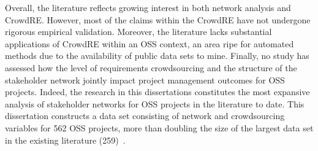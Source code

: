 Overall, the literature reflects growing interest in both network analysis and CrowdRE. However, most of the claims within the CrowdRE have not undergone rigorous empirical validation. Moreover, the literature lacks substantial applications of CrowdRE within an OSS context, an area ripe for automated methods due to the availability of public data sets to mine. Finally, no study has assessed how the level of requirements crowdsourcing and the structure of the stakeholder network jointly impact project management outcomes for OSS projects. Indeed, the research in this dissertations constitutes the most expansive analysis of stakeholder networks for OSS projects in the literature to date. This dissertation constructs a data set consisting of network and crowdsourcing variables for 562 OSS projects, more than doubling the size of the largest data set in the existing literature (259)~\cite{iyer}.